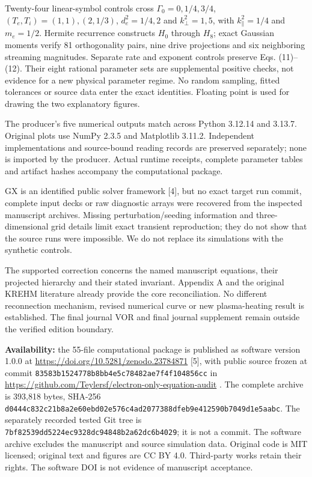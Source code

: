 Twenty-four linear-symbol controls cross \(\Gamma_0=0,1/4,3/4\),
\((T_e,T_i)=(1,1),(2,1/3)\), \(d_e^2=1/4,2\) and \(k_\perp^2=1,5\), with
\(k_\parallel^2=1/4\) and \(m_e=1/2\). Hermite recurrence constructs
\(H_0\) through \(H_8\); exact Gaussian moments verify 81 orthogonality
pairs, nine drive projections and six neighboring streaming magnitudes.
Separate rate and exponent controls preserve Eqs. (11)--(12). Their
eight rational parameter sets are supplemental positive checks, not
evidence for a new physical parameter regime. No random sampling, fitted
tolerances or source data enter the exact identities. Floating point is
used for drawing the two explanatory figures.

The producer's five numerical outputs match across Python 3.12.14 and
3.13.7. Original plots use NumPy 2.3.5 and Matplotlib 3.11.2.
Independent implementations and source-bound reading records are
preserved separately; none is imported by the producer. Actual runtime
receipts, complete parameter tables and artifact hashes accompany the
computational package.

GX is an identified public solver framework {[}4{]}, but no exact target
run commit, complete input decks or raw diagnostic arrays were recovered
from the inspected manuscript archives. Missing perturbation/seeding
information and three-dimensional grid details limit exact transient
reproduction; they do not show that the source runs were impossible. We
do not replace its simulations with the synthetic controls.

The supported correction concerns the named manuscript equations, their
projected hierarchy and their stated invariant. Appendix A and the
original KREHM literature already provide the core reconciliation. No
different reconnection mechanism, revised numerical curve or new
plasma-heating result is established. The final journal VOR and final
journal supplement remain outside the verified edition boundary.

\textbf{Availability:} the 55-file computational package is published as
software version 1.0.0 at \url{https://doi.org/10.5281/zenodo.23784871}
{[}5{]}, with public source frozen at commit
\nolinkurl{83583b1524778b8bb4e5c78482ae7f4f104856cc} in
\url{https://github.com/Teylersf/electron-only-equation-audit} . The
complete archive is 393,818 bytes, SHA-256
\nolinkurl{d0444c832c21b8a2e60ebd02e576c4ad2077388dfeb9e412590b7049d1e5aabc}.
The separately recorded tested Git tree is
\nolinkurl{7bf82539dd5224ec9328dc94848b2a62dc6b4029}; it is not a commit.
The software archive excludes the manuscript and source simulation data.
Original code is MIT licensed; original text and figures are CC BY 4.0.
Third-party works retain their rights. The software DOI is not evidence
of manuscript acceptance.


